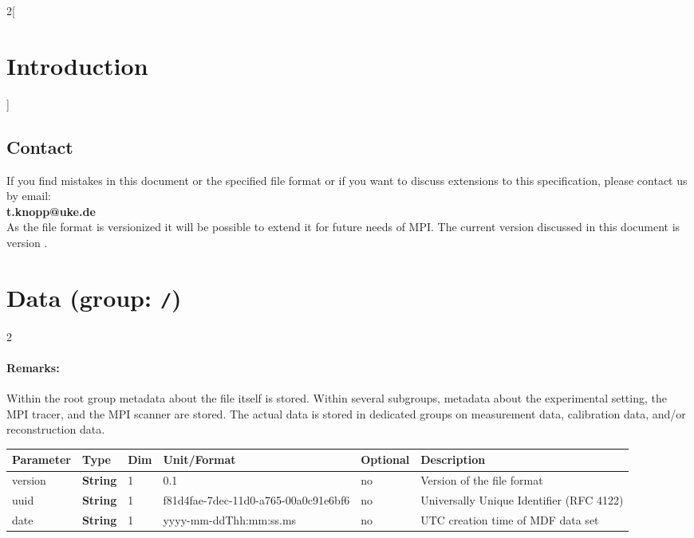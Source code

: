 \documentclass[landscape]{article} %
\newcommand{\inl}[1]{\lstinline[columns=fixed]{#1}}
\newcommand{\inltab}[1]{{\ttfamily\bfseries\color{blue}#1}}
\newcommand{\inlvar}[1]{{\ttfamily#1}}
\begin{document}
\begin{multicols}{2}[\section{Introduction} \label{Sec:Introduction}]
\subsection{Contact}

If you find mistakes in this document or the specified file format or if you want to discuss extensions to this specification, please contact us by email:\\
\hspace*{1cm}\textbf{t.knopp@uke.de}
\\
As the file format is versionized it will be possible to extend it for future needs of MPI. The current version discussed in this document is version \version.

\end{multicols}


\section{Data (group: \inl{/})}
 \setlength\extrarowheight{5pt}

\begin{multicols}{2}

\paragraph{Remarks:} Within the root group metadata about the file itself is stored. Within several subgroups, metadata about the experimental setting, the MPI tracer, and the MPI scanner are stored. The actual data is stored in dedicated groups on measurement data, calibration data, and/or reconstruction data.

\end{multicols}


\noindent \begin{tabularx}{\columnwidth}{lllllX} 
\textbf{Parameter} & \textbf{Type} & \textbf{Dim} & \textbf{Unit/Format} & \textbf{Optional} & \textbf{Description} \\ \hline 
\inlvar{version} & \inltab{String} & 1 & 0.1 & no & Version of the file format \\ \hline
\inlvar{uuid} & \inltab{String} & 1 & f81d4fae-7dec-11d0-a765-00a0c91e6bf6 & no & Universally Unique Identifier (RFC 4122) \\ \hline 
\inlvar{date} & \inltab{String} & 1 & yyyy-mm-ddThh:mm:ss.ms & no & UTC creation time of MDF data set \\ \hline
\end{tabularx}
\end{document}
